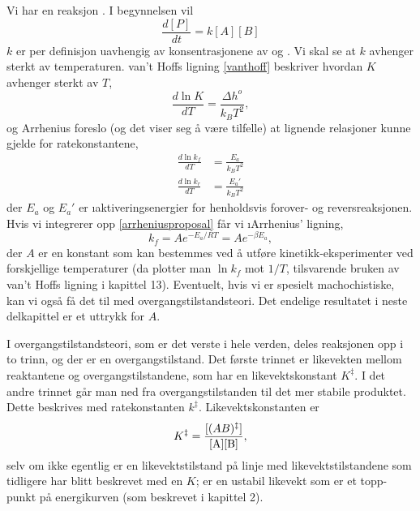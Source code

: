 \noindent Vi har en reaksjon . I begynnelsen vil 
\begin{equation}
	\frac{d[P]}{dt}=k[A][B]
\end{equation}
$k$ er per definisjon uavhengig av konsentrasjonene av  og . Vi skal se at $k$ avhenger sterkt av temperaturen. van't Hoffs ligning \eqref{vanthoff} beskriver hvordan $K$ avhenger sterkt av $T$,
\begin{equation}
	\frac{d\ln K}{dT}=\frac{\Delta h^o}{k_BT^2},
\end{equation}
og Arrhenius foreslo (og det viser seg å være tilfelle) at lignende relasjoner kunne gjelde for ratekonstantene,
\begin{align}
	\label{arrheniusproposal}
    \frac{d\ln k_f}{dT}&=\frac{E_a}{k_BT^2} \\
    \frac{d\ln k_r}{dT}&=\frac{E_a'}{k_BT^2}
\end{align}
der $E_a$ og $E_a'$ er \i{aktiveringsenergi}er for henholdsvis forover- og reversreaksjonen. Hvis vi integrerer opp \eqref{arrheniusproposal} får vi \i{Arrhenius' ligning},
\begin{equation}
	\label{arrheniusratelaw}
	k_f=Ae^{-E_a/RT}=Ae^{-\beta E_a},
\end{equation}
der $A$ er en konstant som kan bestemmes ved å utføre kinetikk-eksperimenter ved forskjellige temperaturer (da plotter man $\ln k_f$ mot $1/T$, tilsvarende bruken av van't Hoffs ligning i kapittel 13). Eventuelt, hvis vi er spesielt machochistiske, kan vi også få det til med overgangstilstandsteori. Det endelige resultatet i neste delkapittel er et uttrykk for $A$.

I overgangstilstandsteori, som er det verste i hele verden, deles reaksjonen opp i to trinn, 
og
der  er en overgangstilstand. Det første trinnet er likevekten mellom reaktantene og overgangstilstandene, som har en likevektskonstant $K^\ddag$. I det andre trinnet går man ned fra overgangstilstanden til det mer stabile produktet. Dette beskrives med ratekonstanten $k^\ddag$. Likevektskonstanten er
\begin{equation}
	K^\ddag=\frac{[(AB)^\ddag]}{\ce{[A][B]}},
\end{equation}
selv om  ikke egentlig er en likevektstilstand på linje med likevektstilstandene som tidligere har blitt beskrevet med en $K$;  er en ustabil likevekt som er et topp-punkt på energikurven (som beskrevet i kapittel 2).

